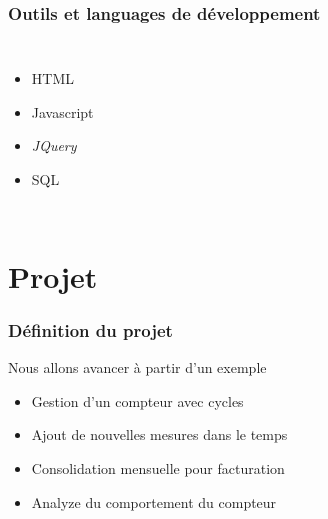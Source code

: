 \documentclass{beamer}
\begin{document}
\begin{frame}[fragile]
  \frametitle{Outils et languages de développement}


\begin{columns}[c]

  \begin{itemize}
   \item HTML
   \item Javascript
   \item \textit{JQuery}
   \item \alert{SQL}
  \end{itemize}  

\end{columns}
\end{frame}

\section{Projet}


\begin{frame}[fragile]
  \frametitle{Définition du projet}

  Nous allons avancer à partir d'un exemple

  \begin{itemize}
    \item<1-> Gestion d'un compteur avec cycles
    \item<2-> Ajout de nouvelles mesures dans le temps
    \item<3-> Consolidation mensuelle pour facturation
    \item<4-> Analyze du comportement du compteur
  \end{itemize}
\end{frame}
\end{document}
